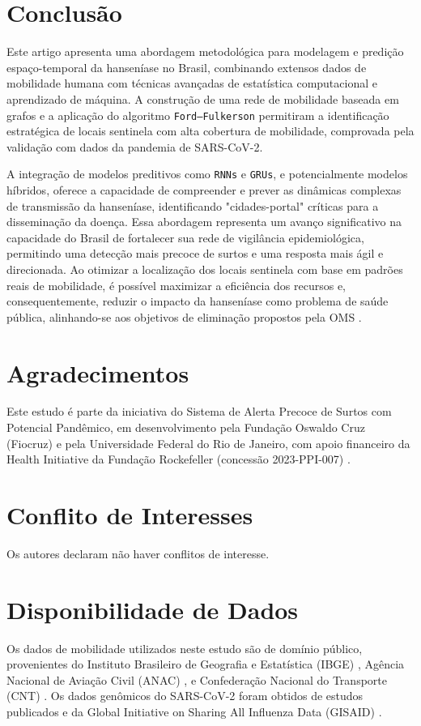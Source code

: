 \documentclass[preprint,12pt]{elsarticle}
\begin{document}
\section{Conclusão}
Este artigo apresenta uma abordagem metodológica para modelagem e predição espaço-temporal da hanseníase no Brasil, combinando extensos dados de mobilidade humana com técnicas avançadas de estatística computacional e aprendizado de máquina. A construção de uma rede de mobilidade baseada em grafos e a aplicação do algoritmo \texttt{Ford--Fulkerson} permitiram a identificação estratégica de locais sentinela com alta cobertura de mobilidade, comprovada pela validação com dados da pandemia de SARS-CoV-2.

A integração de modelos preditivos como \texttt{RNNs} e \texttt{GRUs}, e potencialmente modelos híbridos, oferece a capacidade de compreender e prever as dinâmicas complexas de transmissão da hanseníase, identificando "cidades-portal" críticas para a disseminação da doença. Essa abordagem representa um avanço significativo na capacidade do Brasil de fortalecer sua rede de vigilância epidemiológica, permitindo uma detecção mais precoce de surtos e uma resposta mais ágil e direcionada. Ao otimizar a localização dos locais sentinela com base em padrões reais de mobilidade, é possível maximizar a eficiência dos recursos e, consequentemente, reduzir o impacto da hanseníase como problema de saúde pública, alinhando-se aos objetivos de eliminação propostos pela OMS \cite{who2021zero, who2016global_strategy}.

\section*{Agradecimentos}
Este estudo é parte da iniciativa do Sistema de Alerta Precoce de Surtos com Potencial Pandêmico, em desenvolvimento pela Fundação Oswaldo Cruz (Fiocruz) e pela Universidade Federal do Rio de Janeiro, com apoio financeiro da Health Initiative da Fundação Rockefeller (concessão 2023-PPI-007) \cite{oliveira2024acknowledgments}.

\section*{Conflito de Interesses}
Os autores declaram não haver conflitos de interesse.

\section*{Disponibilidade de Dados}
Os dados de mobilidade utilizados neste estudo são de domínio público, provenientes do Instituto Brasileiro de Geografia e Estatística (IBGE) \cite{oliveira2024summary, oliveira2024data, brasil2017hanseniase}, Agência Nacional de Aviação Civil (ANAC) \cite{oliveira2024summary, oliveira2024transport}, e Confederação Nacional do Transporte (CNT) \cite{oliveira2024summary, oliveira2024transport}. Os dados genômicos do SARS-CoV-2 foram obtidos de estudos publicados e da Global Initiative on Sharing All Influenza Data (GISAID) \cite{oliveira2024genetic, oliveira2024transport, candido2020evolution, naveca2021covid}.



\end{document}
